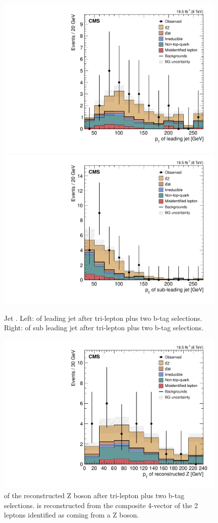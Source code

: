 \begin{figure}[h]
\begin{center}
\includegraphics[width=0.48\linewidth]{Figs/Plots_PreSelections/hJ1Pt_3L2b.pdf}
\includegraphics[width=0.48\linewidth]{Figs/Plots_PreSelections/hJ2Pt_3L2b.pdf}
\caption{\label{fig:JPt_3L2b}
Jet \pt . Left: \pt of leading jet after tri-lepton plus two b-tag selections. Right: \pt of sub leading jet after tri-lepton plus two b-tag selections.
}
\end{center}
\end{figure}


\begin{figure}[h]
\begin{center}
\includegraphics[width=0.48\linewidth]{Figs/Plots_PreSelections/hZPt_3L2b.pdf}
\caption{\label{fig:hzpt_3L2b}
\pt of the reconstructed Z boson after tri-lepton plus two b-tag selections. \pt is reconstructed from the composite 4-vector of the 2 leptons identified as coming from a Z boson.
}
\end{center}
\end{figure}

\clearpage

